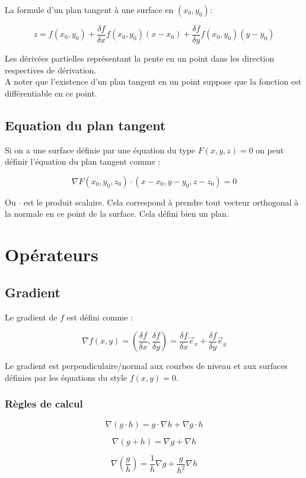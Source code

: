 \documentclass[12pt,a4paper]{report}
\begin{document}
La formule d'un plan tangent à une surface en $(x_0,y_0)$:

$$ z = f(x_0,y_0) + \frac{\delta f}{\delta x}f(x_0,y_0)(x-x_0) + \frac{\delta f}{\delta y}f(x_0,y_0)(y-y_0) $$

Les dérivées partielles représentant la pente en un point dans les direction respectives de dérivation. \\

A noter que l'existence d'un plan tangent en un point suppose que la fonction est différentiable en ce point.

\subsection*{Equation du plan tangent}

Si on a une surface définie par une équation du type $F(x,y,z) = 0$ on peut définir l'équation du plan tangent comme :

$$\nabla F(x_0,y_0,z_0) \cdot (x-x_0,y-y_0,z-z_0) = 0$$

Ou $\cdot$ est le produit scalaire. Cela correspond à prendre tout vecteur orthogonal à la normale en ce point de la surface. Cela défini bien un plan.

\section{Opérateurs}

\subsection{Gradient}

Le gradient de $f$ est défini comme :

$$\nabla f(x,y) = (\frac{\delta f}{\delta x} , \frac{\delta f}{\delta y}) = \frac{\delta f}{\delta x}\vec{e}_x + \frac{\delta f}{\delta y}\vec{e}_y$$

Le gradient est perpendiculaire/normal aux courbes de niveau et aux surfaces définies par les équations du style $f(x,y) = 0$.

\subsubsection{Règles de calcul}

$$\nabla(g \cdot h) = g \cdot \nabla h + \nabla g \cdot h$$

$$\nabla(g + h) = \nabla g + \nabla h$$

$$\nabla \left( \frac{g}{h} \right) = \frac{1}{h}\nabla g + \frac{g}{h^2} \nabla h$$ 
\end{document}
